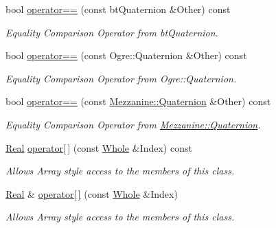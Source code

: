 \begin{DoxyCompactItemize}
bool \hyperlink{classMezzanine_1_1Quaternion_a215b5281dd8e04e78e6b83e0b22f82e5}{operator==} (const btQuaternion \&Other) const 
\begin{DoxyCompactList}\small\item\em Equality Comparison Operator from btQuaternion. \item\end{DoxyCompactList}\item 
bool \hyperlink{classMezzanine_1_1Quaternion_a3e59a2f24d3a0eb69e3088a78fedb6a2}{operator==} (const Ogre::Quaternion \&Other) const 
\begin{DoxyCompactList}\small\item\em Equality Comparison Operator from Ogre::Quaternion. \item\end{DoxyCompactList}\item 
bool \hyperlink{classMezzanine_1_1Quaternion_a3bc8e9a4943bcd9b52a467a455e0d30d}{operator==} (const \hyperlink{classMezzanine_1_1Quaternion}{Mezzanine::Quaternion} \&Other) const 
\begin{DoxyCompactList}\small\item\em Equality Comparison Operator from \hyperlink{classMezzanine_1_1Quaternion}{Mezzanine::Quaternion}. \item\end{DoxyCompactList}\item 
\hyperlink{namespaceMezzanine_a726731b1a7df72bf3583e4a97282c6f6}{Real} \hyperlink{classMezzanine_1_1Quaternion_a443e31ce9eaa52e0f0e7d91aa427c3ce}{operator\mbox{[}$\,$\mbox{]}} (const \hyperlink{namespaceMezzanine_adcbb6ce6d1eb4379d109e51171e2e493}{Whole} \&Index) const 
\begin{DoxyCompactList}\small\item\em Allows Array style access to the members of this class. \item\end{DoxyCompactList}\item 
\hyperlink{namespaceMezzanine_a726731b1a7df72bf3583e4a97282c6f6}{Real} \& \hyperlink{classMezzanine_1_1Quaternion_a85b80d7a93909a60b085f693ae7a8cde}{operator\mbox{[}$\,$\mbox{]}} (const \hyperlink{namespaceMezzanine_adcbb6ce6d1eb4379d109e51171e2e493}{Whole} \&Index)
\begin{DoxyCompactList}\small\item\em Allows Array style access to the members of this class. \item\end{DoxyCompactList}\item 

\end{DoxyCompactItemize}
